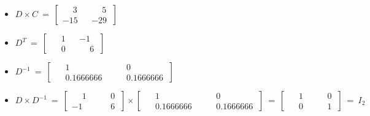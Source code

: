 \documentclass[12pt]{article}
\begin{document}
\begin{enumerate}
\begin{itemize}
		\BlankLine\BlankLine
		
		\item $ D \times C  \ = \ \begin{bmatrix}
			\phantom{-}3 && \phantom{-}5 \ \\
			-15 && -29 \ 
		\end{bmatrix}$
		
		\BlankLine\BlankLine
		
		\item $ D^{T}  \ = \ \begin{bmatrix} \phantom{-}1 && -1 \\ \phantom{-}0  && \phantom{-}6 \  \end{bmatrix}$ 
		
		\BlankLine\BlankLine
		
		\item $ D^{-1} \ = \ \begin{bmatrix} \phantom{-}1 && \phantom{-}0 \ \\ \phantom{-}0.1666666 && \phantom{-}0.1666666 \  \end{bmatrix}$
		
		\BlankLine\BlankLine
		
		\item $ D \times D^{-1} \ = \ \begin{bmatrix} \phantom{-}1 && \phantom{-}0 \ \\ -1 && \phantom{-}6 \  \end{bmatrix} \times \begin{bmatrix} \phantom{-}1 && \phantom{-}0 \ \\ \phantom{-}0.1666666 && \phantom{-}0.1666666 \  \end{bmatrix} \ = \ \begin{bmatrix} \phantom{-}1 && \phantom{-}0 \ \\ \phantom{-}0 && \phantom{-}1 \  \end{bmatrix} \ = \ I_2$ 
		
	\end{itemize}
		
	
\end{enumerate}
\end{document}
